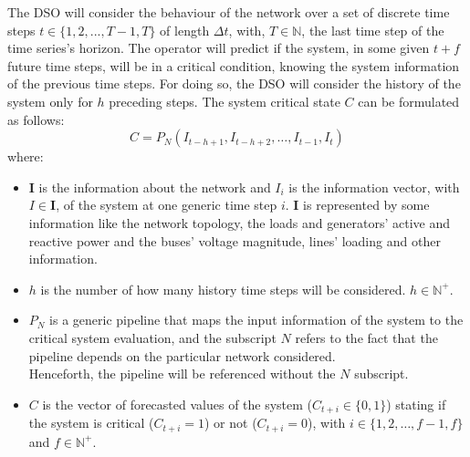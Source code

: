 The \gls{DSO} will consider the behaviour of the network over a set of discrete time steps $t \in \{1,2,...,T-1,T\}$ of length $\Delta t$, with, $T \in \mathbb{N}$, the last time step of the time series’s horizon. The operator will predict if the system, in some given $t+f$ future time steps, will be in a critical condition, knowing the system information of the previous time steps. For doing so, the \gls{DSO} will consider the history of the system only for $h$ preceding steps. The system critical state $C$ can be formulated as follows: 
\begin{equation} \label{eq:fmapping}
    C = P_N(I_{t-h+1},I_{t-h+2},\dots,I_{t-1},I_{t})
\end{equation}
\noindent where:
\begin{itemize}
    \item $\textbf{I}$ is the information about the network and $I_i$ is the information vector, with $I \in \textbf{I}$, of the system at one generic time step $i$.
    $\textbf{I}$ is represented by some information like the network topology, the loads and generators' active and reactive power and the buses' voltage magnitude, lines' loading and other information.
    
    \item $h$ is the number of how many history time steps will be considered. $h \in \mathbb{N}^+$.
    
    \item $P_N$ is a generic pipeline that maps the input information of the system to the critical system evaluation, and the subscript $N$ refers to the fact that the pipeline depends on the particular network considered. \\
    Henceforth, the pipeline will be referenced without the $N$ subscript.%
    
    \item $C$ is the vector of forecasted values of the system ($C_{t+i} \in \{0,1\}$) stating if the system is critical ($C_{t+i}=1$) or not ($C_{t+i}=0$), with $i \in \{1,2,\dots,f-1,f\}$ and $f \in \mathbb{N}^+$. 
\end{itemize}

